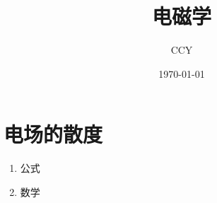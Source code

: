 \documentclass{ctexart}
\title{电磁学}
\author{CCY}
\date{\today}
\begin{document}
\maketitle
\section{电场的散度}
\begin{enumerate}
\item 公式
\item 数学
\end{enumerate}
\end{document}
